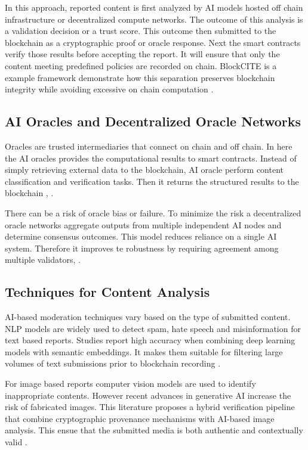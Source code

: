 In this approach, reported content is first analyzed by AI models hosted off chain infrastructure or decentralized compute networks. The outcome of this analysis is a validation decision or a trust score. This outcome then submitted to the blockchain as a cryptographic proof or oracle response. Next the smart contracts verify those results before accepting the report. It will ensure that only the content meeting predefined policies are recorded on chain. BlockCITE is a example framework demonstrate how this separation preserves blockchain integrity while avoiding excessive on chain computation \cite{li2025blockcite}.

\subsection{\ac{AI} Oracles and Decentralized Oracle Networks}

Oracles are trusted intermediaries that connect on chain and off chain. In here the \ac{AI} oracles provides the computational results to smart contracts. Instead of simply retrieving external data to the blockchain, \ac{AI} oracle perform content classification and verification tasks. Then it returns the structured results to the blockchain \cite{kava2024aipowered}, \cite{zintusart2025empirical}.  

There can be a risk of oracle bias or failure. To minimize the risk a decentralized oracle networks aggregate outputs from multiple independent \ac{AI} nodes and determine consensus outcomes. This model reduces reliance on a single \ac{AI} system. Therefore it improves te robustness by requiring agreement among multiple validators\cite{zintusart2025empirical}, \cite{codezeros2025aipowered}.

\subsection{Techniques for Content Analysis}

\ac{AI}-based moderation techniques vary based on the type of submitted content. \ac{NLP} models are widely used to detect spam, hate speech and misinformation for text based reports. Studies report high accuracy when combining deep learning models with semantic embeddings. It makes them suitable for filtering large volumes of text submissions prior to blockchain recording \cite{wani2024ai}.  

For image based reports computer vision models are used to identify inappropriate contents. However recent advances in generative AI increase the risk of fabricated images. This literature proposes a hybrid verification pipeline that combine cryptographic provenance mechanisms with \ac{AI}-based image analysis. This ensue that the submitted media is both authentic and contextually valid \cite{prasad2024blockchain}.

